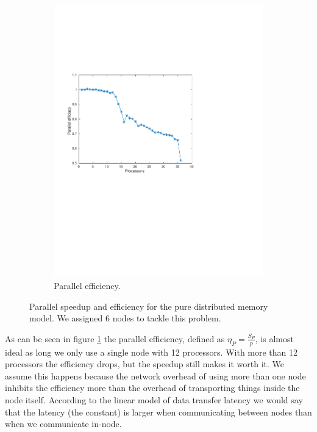\begin{figure}[h]
\begin{subfigure}[b]{0.45\textwidth}
			\includegraphics[width=\textwidth]{./figures/efficiacy}
			\caption{Parallel efficiency.}
			\label{fig:efficiacy}
        \end{subfigure}%
        \caption{Parallel speedup and efficiency for the pure distributed memory model. We assigned 6 nodes to tackle this problem.}
        \label{fig:analysis}
\end{figure}

As can be seen in figure \ref{fig:efficiacy} the parallel efficiency, defined as $\eta_P=\frac{S_P}{p}$, is almost ideal as long we only use a single node with 12 processors. With more than 12 processors the efficiency drops, but the speedup still makes it worth it. We assume this happens because the network overhead of using more than one node inhibits the efficiency more than the overhead of transporting things inside the node itself. According to the linear model of data transfer latency we would say that the latency (the constant) is larger when communicating between nodes than when we communicate in-node.


